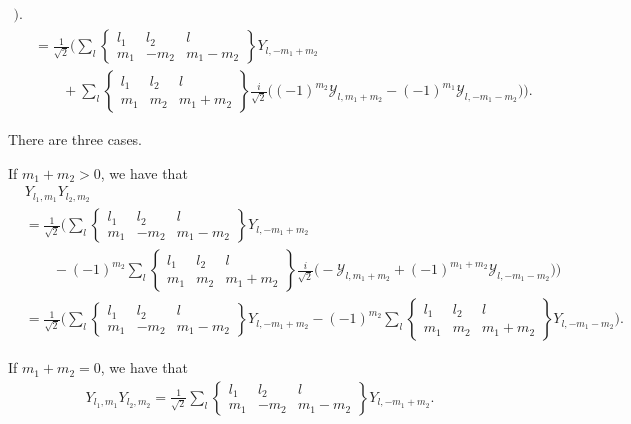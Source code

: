 \documentclass[10pt]{article}
\begin{document}
\begin{itemize}
\begin{align*}
			\bigg). \\
			& = \frac{1}{\sqrt{2}} \bigg( 
			 \sum_{l} \begin{Bmatrix} l_1 & l_2 & l \\ m_1 & -m_2 & m_1 - m_2 \end{Bmatrix} Y_{l,-m_1+m_2} \\			
			& \qquad + \sum_{l} \begin{Bmatrix} l_1 & l_2 & l \\ m_1 & m_2 & m_1 + m_2 \end{Bmatrix} \frac{i}{\sqrt{2}} \bigg( (-1)^{m_2} \mathcal{Y}_{l, m_1+m_2}  - (-1)^{m_1}\mathcal{Y}_{l, -m_1-m_2} \bigg)
			\bigg).
		\end{align*}

		There are three cases.

		If $m_1 + m_2 > 0$, we have that
		\begin{align*}
			& Y_{l_1, m_1} Y_{l_2, m_2} \\
			& = \frac{1}{\sqrt{2}} \bigg( 
			 \sum_{l} \begin{Bmatrix} l_1 & l_2 & l \\ m_1 & -m_2 & m_1 - m_2 \end{Bmatrix} Y_{l,-m_1+m_2} \\			
			& \qquad - (-1)^{m_2} \sum_{l} \begin{Bmatrix} l_1 & l_2 & l \\ m_1 & m_2 & m_1 + m_2 \end{Bmatrix} \frac{i}{\sqrt{2}} \bigg(-  \mathcal{Y}_{l, m_1+m_2}  + (-1)^{m_1+m_2}\mathcal{Y}_{l, -m_1-m_2} \bigg)
			\bigg) \\
			& = \frac{1}{\sqrt{2}} \bigg( 
			 \sum_{l} \begin{Bmatrix} l_1 & l_2 & l \\ m_1 & -m_2 & m_1 - m_2 \end{Bmatrix} Y_{l,-m_1+m_2} 
			- (-1)^{m_2} \sum_{l} \begin{Bmatrix} l_1 & l_2 & l \\ m_1 & m_2 & m_1 + m_2 \end{Bmatrix} Y_{l,-m_1-m_2}
			\bigg).
		\end{align*}
		
		If $m_1+m_2 = 0$, we have that
		\begin{align*}
			Y_{l_1, m_1} Y_{l_2, m_2}
			= \frac{1}{\sqrt{2}} \sum_{l} \begin{Bmatrix} l_1 & l_2 & l \\ m_1 & -m_2 & m_1 - m_2 \end{Bmatrix} Y_{l,-m_1+m_2}.			
		\end{align*}


\end{itemize}
\end{document}
